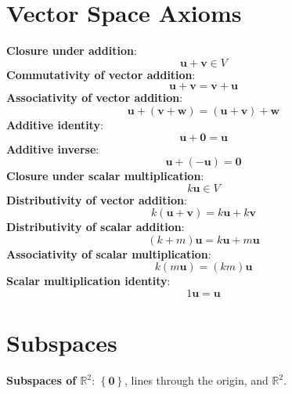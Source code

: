 \documentclass{article}
\begin{document}
\begin{multicols*}{2}
    \section*{Vector Space Axioms}
    \textbf{Closure under addition}:
    \begin{equation*}
        \symbf{u}+\symbf{v} \in V
    \end{equation*}
    \textbf{Commutativity of vector addition}:
    \begin{equation*}
        \symbf{u} + \symbf{v} = \symbf{v} + \symbf{u}
    \end{equation*}
    \textbf{Associativity of vector addition}:
    \begin{equation*}
        \symbf{u} + \left(\symbf{v} + \symbf{w}\right) =
        \left(\symbf{u} + \symbf{v}\right) + \symbf{w}
    \end{equation*}
    \textbf{Additive identity}:
    \begin{equation*}
        \symbf{u} + \symbf{0} = \symbf{u}
    \end{equation*}
    \textbf{Additive inverse}:
    \begin{equation*}
        \symbf{u} + \left(-\symbf{u}\right) = \symbf{0}
    \end{equation*}
    \textbf{Closure under scalar multiplication}:
    \begin{equation*}
        k\symbf{u} \in V
    \end{equation*}
    \textbf{Distributivity of vector addition}:
    \begin{equation*}
        k \left(\symbf{u} + \symbf{v}\right) = k\symbf{u} + k\symbf{v}
    \end{equation*}
    \textbf{Distributivity of scalar addition}:
    \begin{equation*}
        \left(k+m\right)\symbf{u} = k\symbf{u} + m\symbf{u}
    \end{equation*}
    \textbf{Associativity of scalar multiplication}:
    \begin{equation*}
        k\left(m\symbf{u}\right)=\left(km\right)\symbf{u}
    \end{equation*}
    \textbf{Scalar multiplication identity}:
    \begin{equation*}
        1 \symbf{u}=\symbf{u}
    \end{equation*}
    \section*{Subspaces}
    \textbf{Subspaces of \(\mathbb{R}^2\)}: \(\left\{ \symbf{0} \right\}\),
    lines through the origin, and \(\mathbb{R}^2\).


\end{multicols*}
\end{document}
